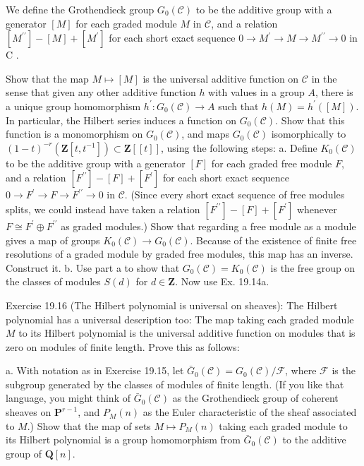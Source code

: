 \documentclass[10pt, letterpaper]{article}
\begin{document}
We define the Grothendieck group $G_0(\mathcal{C})$ to be the additive group with a generator $[M]$ for each graded module $M$ in $\mathcal{C}$, and a relation $\left[M^{\prime \prime}\right]- [M]+\left[M^{\prime}\right]$ for each short exact sequence $0 \rightarrow M^{\prime} \rightarrow M \rightarrow M^{\prime \prime} \rightarrow 0$ in C .

Show that the map $M \mapsto[M]$ is the universal additive function on $\mathcal{C}$ in the sense that given any other additive function $h$ with values in a group $A$, there is a unique group homomorphism $h^{\prime}: G_0(\mathcal{C}) \rightarrow A$ such that $h(M)=h^{\prime}([M])$. In particular, the Hilbert series induces a function on $G_0(\mathcal{C})$. Show that this function is a monomorphism on $G_0(\mathcal{C})$, and maps $G_0(\mathcal{C})$ isomorphically to $(1-t)^{-r}\left(\mathbf{Z}\left[t, t^{-1}\right]\right) \subset \mathbf{Z}[[t]]$, using the following steps:
a. Define $K_0(\mathcal{C})$ to be the additive group with a generator $[F]$ for each graded free module $F$, and a relation $\left[F^{\prime \prime}\right]-[F]+\left[F^{\prime}\right]$ for each short exact sequence $0 \rightarrow F^{\prime} \rightarrow F \rightarrow F^{\prime \prime} \rightarrow 0$ in $\mathcal{C}$. (Since every short exact sequence of free modules splits, we could instead have taken a relation $\left[F^{\prime \prime}\right]-[F]+\left[F^{\prime}\right]$ whenever $F \cong F^{\prime} \oplus F^{\prime \prime}$ as graded modules.) Show that regarding a free module as a module gives a map of groups $K_0(\mathcal{C}) \rightarrow G_0(\mathcal{C})$. Because of the existence of finite free resolutions of a graded module by graded free modules, this map has an inverse. Construct it.
b. Use part a to show that $G_0(\mathcal{C})=K_0(\mathcal{C})$ is the free group on the classes of modules $S(d)$ for $d \in \mathbf{Z}$. Now use Ex. 19.14a.

Exercise 19.16 (The Hilbert polynomial is universal on sheaves): The Hilbert polynomial has a universal description too: The map taking each graded module $M$ to its Hilbert polynomial is the universal additive function on modules that is zero on modules of finite length. Prove this as follows:

a. With notation as in Exercise 19.15, let $\bar{G}_0(\mathcal{C})=G_0(\mathcal{C}) / \mathcal{F}$, where $\mathcal{F}$ is the subgroup generated by the classes of modules of finite length. (If you like that language, you might think of $\bar{G}_0(\mathcal{C})$ as the Grothendieck group of coherent sheaves on $\mathbf{P}^{r-1}$, and $P_M(n)$ as the Euler characteristic of the sheaf associated to $M$.) Show that the map of sets $M \mapsto P_M(n)$ taking each graded module to its Hilbert polynomial is a group homomorphism from $\bar{G}_0(\mathcal{C})$ to the additive group of $\mathbf{Q}[n]$.
\end{document}
